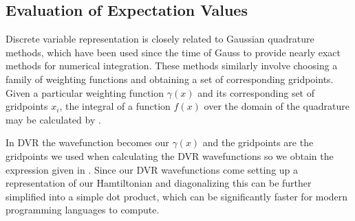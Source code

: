 \subsection{Evaluation of Expectation Values}

Discrete variable representation is closely related to Gaussian quadrature methods, which have been used since the time of Gauss to provide nearly exact methods for numerical integration\cite{Light2007}. These methods similarly involve choosing a family of weighting functions and obtaining a set of corresponding gridpoints. Given a particular weighting function $\gamma(x)$ and its corresponding set of gridpoints ${x_i}$, the integral of a function $f(x)$ over the domain of the quadrature may be calculated by .


In DVR the wavefunction becomes our $\gamma(x)$ and the gridpoints are the gridpoints we used when calculating the DVR wavefunctions so we obtain the expression given in . Since our DVR wavefunctions come setting up a representation of our Hamtiltonian and diagonalizing this can be further simplified into a simple dot product, which can be significantly faster for modern programming languages to compute.


% 

